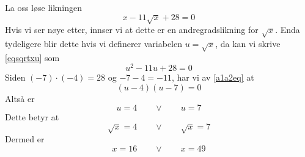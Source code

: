 



	
 \label{Bytvar}
La oss løse likningen 
\begin{equation}\label{eqsqrtxu}
	x-11\sqrt{x}+28=0
\end{equation}
Hvis vi ser nøye etter, innser vi at dette er en andregradslikning for $ \sqrt{x} $. Enda tydeligere blir dette hvis vi definerer variabelen $ u=\sqrt{x} $, da kan vi skrive \eqref{eqsqrtxu} som
\[ u^2-11u+28=0 \]
Siden $ (-7)\cdot(-4)=28 $ og $ -7-4=-11 $, har vi av \eqref{a1a2eq} at
\[ (u-4)(u-7)=0 \]
Altså er 
\[ u=4 \qquad \vee \qquad u=7 \]
Dette betyr at
\[ \sqrt{x}=4 \qquad \vee \qquad \sqrt{x}=7 \]
Dermed er
\[ x=16 \qquad \vee \qquad x=49 \]

